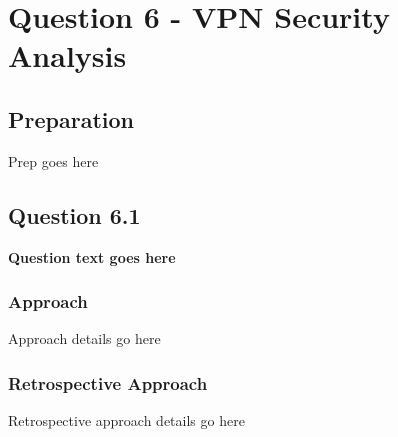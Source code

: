 \chapter{Question 6 - VPN Security Analysis}

\section{Preparation}
Prep goes here

\section{Question 6.1}
\textbf{Question text goes here}
\subsection{Approach}
Approach details go here
\subsection{Retrospective Approach}
Retrospective approach details go here
